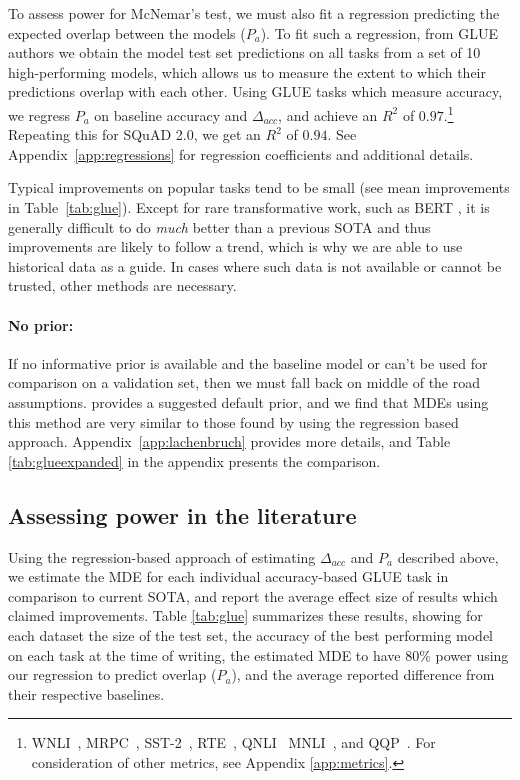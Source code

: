 \documentclass[11pt,a4paper]{article}
\begin{document}
To assess power for McNemar's test, we must also fit a regression predicting the expected overlap between the models ($P_a$). To fit such a regression, from
GLUE authors
we obtain the model test set predictions on all tasks from a set of 10 high-performing models, which allows us to measure the extent to which their predictions overlap with each other. 
Using GLUE tasks which measure accuracy,
we regress $P_a$ on baseline accuracy and $\Delta_{acc}$, and 
achieve an $R^2$ of $0.97$.\footnote{
WNLI~\citep{levesque2012winograd},
MRPC~\citep{dolan-brockett-2005-automatically},
SST-2~\citep{socher2013recursive},
RTE~\citep{dagan2005pascal,bar2006second,giampiccolo2007third,bentivogli2009fifth},
QNLI~\citep{rajpurkar2016squad}
MNLI~\citep{williams2018broad}, and QQP~\citep{iyer2017first}. For consideration of other metrics, see Appendix \ref{app:metrics}.  } 
Repeating this for SQuAD 2.0,
we get an $R^2$ of $0.94$. See Appendix~\ref{app:regressions} for regression coefficients and additional details.

Typical improvements on popular tasks tend to be small (see mean improvements in Table~\ref{tab:glue}). Except for rare transformative work, such as BERT \citep{devlin2018bert}, it is generally difficult to do \emph{much} better than a previous SOTA and thus improvements are likely to follow a trend, which is why we are able to use historical
data as a guide.
In cases where such data is not available or cannot be trusted, other methods are necessary.

\paragraph{No prior:} If no informative prior 
is available 
and the baseline model or can't be used for comparison on a validation set, 
then we must fall back on middle of the road assumptions.
\citet{lachenbruch1992sample} provides a suggested default prior, and we find that MDEs using this method are very similar to those found by using the regression based approach.  Appendix~\ref{app:lachenbruch} provides more details, and Table \ref{tab:glueexpanded} in the appendix presents the comparison.

\subsection{Assessing power in the literature}
\label{sec:acc_lit}

Using the regression-based approach of estimating $\Delta_{acc}$ and $P_a$ described above, we estimate the MDE for each individual accuracy-based GLUE task in comparison to current SOTA, and report the average effect size of results which claimed improvements.
Table \ref{tab:glue} summarizes these results,
showing for each dataset the size of the test set, 
the accuracy of the best performing model on each task at the time of
writing,
the estimated MDE to have 80\% power using our regression 
to predict overlap ($P_a$),
and 
the average reported difference from 
their respective baselines. 
\end{document}
